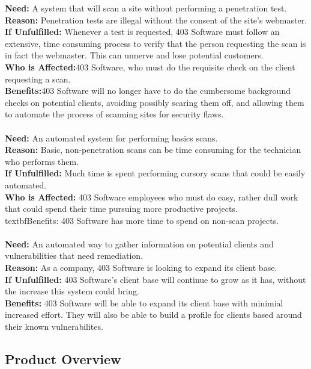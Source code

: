 \textbf{Need: }A system that will scan a site without performing a penetration test.\\
\textbf{Reason: }Penetration tests are illegal without the consent of the site's webmaster.\\
\textbf{If Unfulfilled: }Whenever a test is requested, 403 Software must follow an extensive, time consuming process to verify that the person requesting the scan is in fact the webmaster.  This can unnerve and lose potential customers.\\
\textbf{Who is Affected:}403 Software, who must do the requisite check on the client requesting a scan.\\
\textbf{Benefits:}403 Software will no longer have to do the cumbersome background checks on potential clients, avoiding possibly scaring them off, and allowing them to automate the process of scanning sites for security flaws.\\\\
\textbf{Need: }An automated system for performing basics scans.\\
\textbf{Reason: }Basic, non-penetration scans can be time consuming for the technician who performs them.\\
\textbf{If Unfulfilled:  }Much time is spent performing cursory scans that could be easily automated.\\
\textbf{Who is Affected:	}403 Software employees who must do easy, rather dull work that could spend their time pursuing more productive projects.\
\\textbf{Benefits:	}403 Software has more time to spend on non-scan projects. \\\\
\textbf{Need: }An automated way to gather information on potential clients and vulnerabilities that need remediation.\\
\textbf{Reason:  }As a company, 403 Software is looking to expand its client base.\\
\textbf{If Unfulfilled:  }403 Software's client base will continue to grow as it has, without the increase this system could bring.\\
\textbf{Benefits: }403 Software will be able to expand its client base with minimial increased effort.  They will also be able to build a profile for clients based around their known vulnerabilites.

\subsection{Product Overview}

